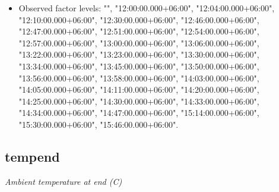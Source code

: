 \documentclass[]{article}
\providecommand{\tightlist}{%
  \setlength{\itemsep}{0pt}\setlength{\parskip}{0pt}}
\begin{document}
\begin{itemize}
\tightlist
\item
  Observed factor levels: "", "12:00:00.000+06:00",
  "12:04:00.000+06:00", "12:10:00.000+06:00", "12:30:00.000+06:00",
  "12:46:00.000+06:00", "12:47:00.000+06:00", "12:51:00.000+06:00",
  "12:54:00.000+06:00", "12:57:00.000+06:00", "13:00:00.000+06:00",
  "13:06:00.000+06:00", "13:22:00.000+06:00", "13:23:00.000+06:00",
  "13:30:00.000+06:00", "13:34:00.000+06:00", "13:45:00.000+06:00",
  "13:50:00.000+06:00", "13:56:00.000+06:00", "13:58:00.000+06:00",
  "14:03:00.000+06:00", "14:05:00.000+06:00", "14:11:00.000+06:00",
  "14:20:00.000+06:00", "14:25:00.000+06:00", "14:30:00.000+06:00",
  "14:33:00.000+06:00", "14:34:00.000+06:00", "14:47:00.000+06:00",
  "15:14:00.000+06:00", "15:30:00.000+06:00", "15:46:00.000+06:00".
\end{itemize}

\noindent\makebox[\linewidth]{\rule{\textwidth}{0.4pt}}

\hypertarget{tempend}{%
\subsection{tempend}\label{tempend}}

\emph{Ambient temperature at end (C)}
\end{document}
